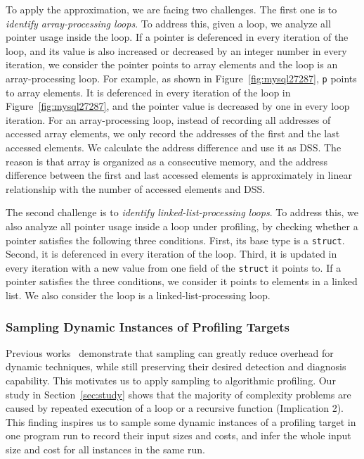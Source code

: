 {{To apply the approximation, we are facing two challenges. 
The first one is to \emph{identify array-processing loops}.
To address this, given a loop, we analyze all pointer usage inside the loop. 
If a pointer is deferenced in every iteration of the loop, 
and its value is also increased or decreased by 
an integer number in every iteration,
we consider the pointer points to array elements and 
the loop is an array-processing loop.  
For example, as shown in Figure~\ref{fig:mysql27287}, 
\texttt{p} points to array elements. 
It is deferenced in every iteration of the loop 
in Figure~\ref{fig:mysql27287},
and the pointer value is decreased by one in every loop iteration. 
For an array-processing loop, 
instead of recording all addresses of 
accessed array elements,
we only record the addresses 
of the first and the last accessed elements. 
We calculate the address difference and use it as DSS.
The reason is that array is organized as a 
consecutive memory, and the address difference 
between the first and last accessed elements is approximately in linear 
relationship with the number of accessed elements and DSS. 





The second challenge is to \emph{identify linked-list-processing loops}.
To address this, we also analyze all pointer usage inside a loop under profiling, 
by checking whether a pointer satisfies the following three conditions.
First, its base type is a \texttt{struct}.
Second, it is deferenced in every iteration of the loop.
Third, it is updated in every iteration with a new value 
from one field of the \texttt{struct} it points to.
If a pointer satisfies the three conditions, 
we consider it points to elements in a linked list.
We also consider the loop is a linked-list-processing loop. 



\subsubsection{Sampling Dynamic Instances of Profiling Targets}
\label{sec:sampling}

Previous works~\cite{liblit03,liblit05,CCI,SongOOPSLA2014,ldoctor}
demonstrate that sampling can greatly 
reduce overhead for dynamic techniques,
while still preserving their desired 
detection and diagnosis capability. 
This motivates us to apply sampling to algorithmic profiling. 
Our study in Section~\ref{sec:study} shows that 
the majority of complexity problems are caused by repeated execution of a loop
or a recursive function (Implication 2). 
This finding inspires us to sample some dynamic instances of 
a profiling target in one program run to 
record their input sizes and costs,
and infer the whole input size and cost for all instances in the same run.


}}
